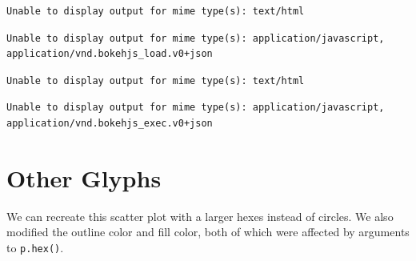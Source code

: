 \documentclass[
  letterpaper,
  DIV=11,
  numbers=noendperiod]{scrreprt}
\begin{document}
\begin{verbatim}
Unable to display output for mime type(s): text/html
\end{verbatim}

\begin{verbatim}
Unable to display output for mime type(s): application/javascript, application/vnd.bokehjs_load.v0+json
\end{verbatim}

\begin{verbatim}
Unable to display output for mime type(s): text/html
\end{verbatim}

\begin{verbatim}
Unable to display output for mime type(s): application/javascript, application/vnd.bokehjs_exec.v0+json
\end{verbatim}

\hypertarget{other-glyphs}{%
\section{Other Glyphs}\label{other-glyphs}}

We can recreate this scatter plot with a larger hexes instead of
circles. We also modified the outline color and fill color, both of
which were affected by arguments to \texttt{p.hex()}.
\end{document}
